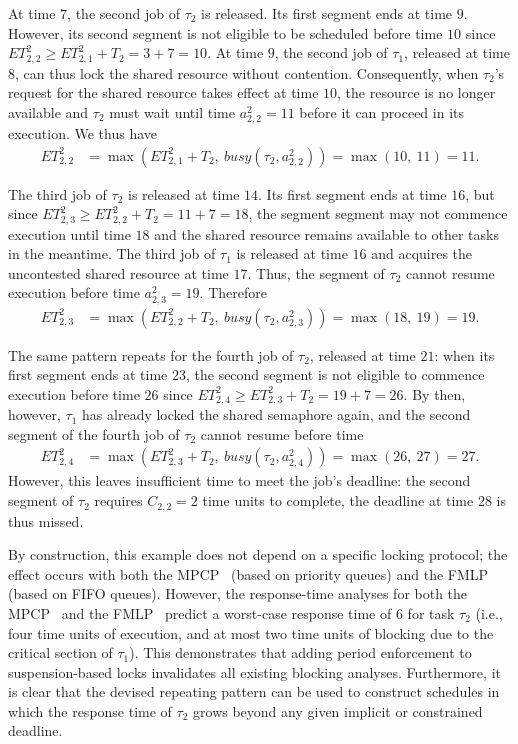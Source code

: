 At time $7$, the second job of $\tau_2$ is released. Its first segment ends at time $9$. However, its second segment is not eligible to be scheduled before time $10$ since $ET_{2,2}^2 \geq ET_{2,1}^2 + T_2 = 3 + 7 = 10$. At time $9$, the second job of $\tau_1$, released at time $8$, can thus lock the shared resource without contention. Consequently, when $\tau_2$'s request for the shared resource takes effect at time $10$, the resource is no longer available and $\tau_2$ must wait until time $a^2_{2,2} = 11$ before it can proceed in its execution. We thus have
\begin{align*}
	ET_{2,2}^2 & = \max\left(ET_{2,1}^2 + T_2,\ \mathit{busy}(\tau_2, a^2_{2,2})\right) =\max(10,\ 11) = 11.
\end{align*}

The third job of $\tau_2$ is released at time $14$. Its first segment ends at time $16$, but since $ET_{2,3}^2 \geq ET_{2,2}^2 + T_2 = 11 + 7 = 18$, the segment segment may not commence execution until time $18$ and the shared resource remains available to other tasks in the meantime. The third job of $\tau_1$ is released at time $16$ and acquires the uncontested shared resource at time $17$. Thus, the segment of $\tau_2$ cannot resume execution before time $a^2_{2,3} = 19$. Therefore
\begin{align*}
	ET_{2,3}^2 & = \max\left(ET_{2,2}^2 + T_2,\ \mathit{busy}(\tau_2, a^2_{2,3})\right) =\max(18,\ 19) = 19.
\end{align*}

The same pattern repeats for the fourth job of $\tau_2$, released at time $21$: when its first segment ends at time $23$, the second segment is not eligible to commence execution before time $26$ since $ET_{2,4}^2 \geq ET_{2,3}^2 + T_2 = 19 + 7 = 26$. By then, however, $\tau_1$ has already locked the shared semaphore again, and the second segment of the fourth job of $\tau_2$ cannot resume before time
\begin{align*}
	ET_{2,4}^2 & = \max\left(ET_{2,3}^2 + T_2,\ \mathit{busy}(\tau_2, a^2_{2,4})\right) =\max(26,\ 27) = 27.
\end{align*}
However, this leaves insufficient time to meet the job's deadline: the second segment of $\tau_2$ requires $C_{2,2} = 2$ time units to complete, the deadline at time $28$ is thus missed.

By construction, this example does not depend on a specific locking protocol; the effect occurs with both the MPCP~\cite{Ra:90} (based on priority queues) and the FMLP~\cite{BLBA:07,BA:08} (based on FIFO queues). However,  the response-time analyses for both the MPCP~\cite{LNR:09,Br:13} and the   FMLP~\cite{Br:13} predict a worst-case response time of $6$ for task $\tau_2$ (i.e., four time units of execution, and at most two time units of blocking due to the critical section of $\tau_1$). This demonstrates that adding period enforcement to suspension-based locks invalidates all existing blocking analyses. Furthermore, it is clear that the devised repeating pattern can be used to construct schedules in which the response time of $\tau_2$  grows beyond any given implicit or constrained deadline.

